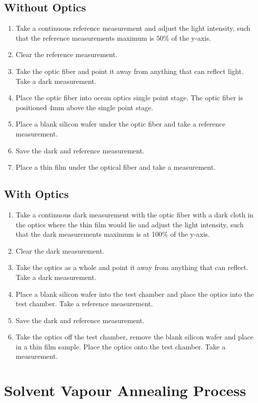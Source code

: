 \documentclass[MasterThesisMain.tex]{subfiles}
\begin{document}
\subsection{Without Optics}
\begin{enumerate}
\item Take a continuous reference measurement and adjust the light intensity, such that the reference measurements maximum is $50\%$ of the y-axis.
\item Clear the reference measurement.
\item Take the optic fiber and point it away from anything that can reflect light. Take a dark measurement.
\item Place the optic fiber into ocean optics single point stage. The optic fiber is positioned $4$mm above the single point stage.
\item Place a blank silicon wafer under the optic fiber and take a reference measurement.
\item Save the dark and reference measurement.
\item Place a thin film under the optical fiber and take a measurement.  
\end{enumerate}

\subsection{With Optics}
\begin{enumerate}
\item Take a continuous dark measurement with the optic fiber with a dark cloth in the optics where the thin film would lie and adjust the light intensity, such that the dark measurements maximum is at 100$\%$ of the y-axis.
\item Clear the dark measurement.
\item Take the optics as a whole and point it away from anything that can reflect. Take a dark measurement.
\item Place a blank silicon wafer into the test chamber and place the optics into the test chamber. Take a reference measurement.
\item Save the dark and reference measurement.
\item Take the optics off the test chamber, remove the blank silicon wafer and place in a thin film sample. Place the optics onto the test chamber. Take a measurement.
\end{enumerate}

\section{Solvent Vapour Annealing Process}
\end{document}
